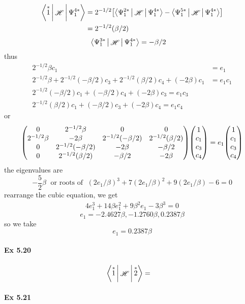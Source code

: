 \documentclass[a4paper]{article}
\DeclareMathOperator{\sH}{\mathscr{H}}
\newcommand{\ex}[1]{\paragraph{Ex #1}}
\numberwithin{equation}{subsection}
\begin{document}
\begin{align}
\Braket{\overset{*}{1} | \sH | \Psi_1^{4*}} &= 2^{-1/2}\qty[\Braket{\Psi_1^{2*} | \sH | \Psi_1^{4*}} - \Braket{\Psi_1^{5*} | \sH | \Psi_1^{4*}}] \notag\\
&= 2^{-1/2} (\beta/2)
\end{align}
\begin{align}
\Braket{\Psi_1^{3*} | \sH | \Psi_1^{4*}} 
&= -\beta/2
\end{align}
thus
\begin{align}
2^{-1/2}\beta c_1 &= e_1 \\
2^{-1/2}\beta + 2^{-1/2}(-\beta/2) c_3 + 2^{-1/2}(\beta/2) c_4 + (-2\beta) c_1 &= e_1 c_1\\
2^{-1/2}(-\beta/2) c_1 + (-\beta/2) c_4 + (-2\beta) c_3 = e_1 c_3\\
2^{-1/2} (\beta/2) c_1 + (-\beta/2) c_3 + (-2\beta) c_4 = e_1 c_4
\end{align}
or
\begin{align}
\mqty(0 & 2^{-1/2}\beta & 0 & 0\\
      2^{-1/2}\beta & -2\beta & 2^{-1/2}(-\beta/2) & 2^{-1/2}(\beta/2)\\
      0 & 2^{-1/2}(-\beta/2) & -2\beta & -\beta/2\\
      0 & 2^{-1/2}(\beta/2) & -\beta/2 & -2\beta)
\mqty(1 \\ c_1 \\ c_3 \\ c_4)
= e_1 \mqty(1 \\ c_1 \\ c_3 \\ c_4)
\end{align}
the eigenvalues are
\begin{equation}\label{key}
-\dfrac{5}{2}\beta \;\text{ or roots of }\; 
(2e_1/\beta)^3 + 7(2e_1/\beta)^2 + 9(2e_1/\beta) - 6 = 0
\end{equation}
rearrange the cubic equation, we get
\begin{align}
4e_1^3 + 14\beta e_1^2 + 9\beta^2 e_1 - 3\beta^3 = 0
\end{align}
\begin{equation}\label{key}
e_1 = -2.4627\beta, -1.2760\beta, 0.2387\beta
\end{equation}
so we take
\begin{equation}\label{key}
e_1 = 0.2387\beta
\end{equation}

\ex{5.20}
\begin{align}
\Braket{\overset{*}{1} | \sH | \overset{*}{2}} &= 
\end{align}

\ex{5.21}
\end{document}
